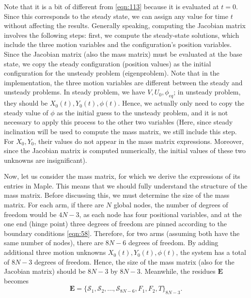 \documentclass[a4paper,12pt]{article}
\begin{document}
Note that it is a bit of different from \eqref{eqn:113} because it is evaluated at $t=0$. Since this corresponds to the steady state, we can assign any value for time $t$ without affecting the results. Generally speaking, computing the Jacobian matrix involves the following steps: first, we compute the steady-state solutions, which include the three motion variables and the configuration's position variables. Since the Jacobian matrix (also the mass matrix) must be evaluated at the base state, we copy the steady configuration (position values) as the initial configuration for the unsteady problem (eigenproblem). Note that in the implementation, the three motion variables are different between the steady and unsteady problems. In steady problem, we have $V, U_0, \phi_{eq}$; in unsteady problem, they should be $X_0(t), Y_0(t), \phi(t)$. Hence, we actually only need to copy the steady value of $\phi$ as the initial guess to the unsteady problem, and it is not necessary to apply this process to the other two variables (Here, since steady inclination will be used to compute the mass matrix, we still include this step. For $X_0, Y_0$, their values do not appear in the mass matrix expressions. Moreover, since the Jacobian matrix is computed numerically, the initial values of these two unknowns are insignificant).

Now, let us consider the mass matrix, for which we derive the expressions of its entries in Maple. This means that we should fully understand the structure of the mass matrix. 
Before discussing this, we must determine the size of the mass matrix. For each arm, if there are $N$ global nodes, the number of degrees of freedom would be $4N-3$, as each node has four positional variables, and at the one end (hinge point) three degrees of freedom are pinned according to the boundary conditions \eqref{eqn:58}. Therefore, for two arms (assuming both have the same number of nodes), there are $8N-6$ degrees of freedom. By adding additional three motion unknowns $X_0(t),Y_0(t),\phi(t)$, the system has a total of $8N-3$ degrees of freedom. Hence, the size of the mass matrix (also for the Jacobian matrix) should be $8N-3$ by $8N-3$. Meanwhile, the residues $\bm{E}$ becomes
\begin{equation}
	\label{eqn:116}
	\bm{E}=\{\mathcal{S}_1,\mathcal{S}_2,...,\mathcal{S}_{8N-6},F_1,F_2,T\}_{8N-3}.
\end{equation}
\end{document}
